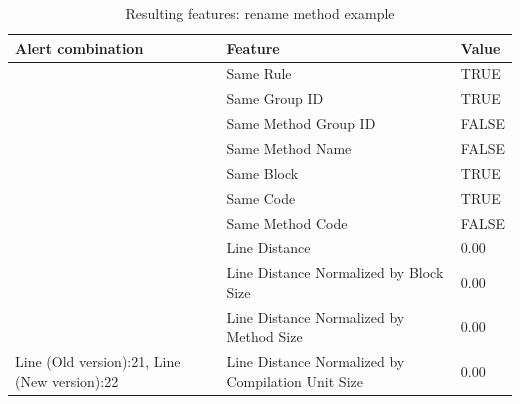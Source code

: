 \documentclass[
]{article}
\begin{document}
\begin{table}[!h]

\caption{\label{tab:unnamed-chunk-8}Resulting features: rename method example \label{features_rename} }
\centering
\begin{tabular}[t]{l|l|l}
\hline
Alert combination & Feature & Value\\
\hline
\rowcolor{gray!6}   & Same Rule & TRUE\\

 & Same Group ID & TRUE\\

\rowcolor{gray!6}   & Same Method Group ID & FALSE\\

 & Same Method Name & FALSE\\

\rowcolor{gray!6}   & Same Block & TRUE\\

 & Same Code & TRUE\\

\rowcolor{gray!6}   & Same Method Code & FALSE\\

 & Line Distance & 0.00\\

\rowcolor{gray!6}   & Line Distance Normalized by Block Size & 0.00\\

 & Line Distance Normalized by Method Size & 0.00\\

\multirow[t]{-11}{*}{\raggedright\arraybackslash Line (Old version):21, Line (New version):22} & Line Distance Normalized by Compilation Unit Size & 0.00\\
\hline
\end{tabular}
\end{table}

\normalsize

\newpage
\end{document}
